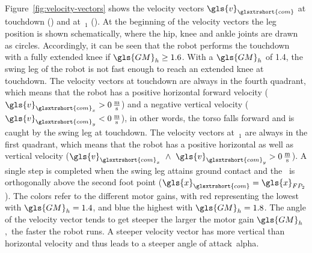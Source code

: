 Figure~\ref{fig:velocity-vectors} shows the velocity vectors$~\gls{v}_{\glsxtrshort{com}}$ at touchdown () and at~$_{1}$ (). At the beginning of the velocity vectors the leg position is shown schematically, where the hip, knee and ankle joints are drawn as circles. Accordingly, it can be seen that the robot performs the touchdown with a fully extended knee if$~\gls{GM}_h \geq 1.6$. With a$~\gls{GM}_h$ of 1.4, the swing leg of the robot is not fast enough to reach an extended knee at touchdown. The velocity vectors at touchdown are always in the fourth quadrant, which means that the robot has a positive horizontal forward velocity ($\gls{v}_{\glsxtrshort{com}_x} > 0\,\textrm{\si{\metre\per\second}}$) and a negative vertical velocity ($\gls{v}_{\glsxtrshort{com}_y} < 0\,\textrm{\si{\metre\per\second}}$), in other words, the torso falls forward and is caught by the swing leg at touchdown. The velocity vectors at~$_{1}$ are always in the first quadrant, which means that the robot has a positive horizontal as well as vertical velocity ($\gls{v}_{\glsxtrshort{com}_x}~\land~\gls{v}_{\glsxtrshort{com}_y} > 0\,\textrm{\si{\metre\per\second}}$). A single step is completed when the swing leg attains ground contact and the~ is orthogonally above the second foot point ($\gls{x}_{\glsxtrshort{com}} = \gls{x}_{FP_2}$). The colors refer to the different motor gains, with red representing the lowest with$~\gls{GM}_h = 1.4$, and blue the highest with$~\gls{GM}_h = 1.8$. The angle of the velocity vector tends to get steeper the larger the motor gain$~\gls{GM}_h$,~\ie the faster the robot runs. A steeper velocity vector has more vertical than horizontal velocity and thus leads to a steeper angle of attack~\gls{alpha}.

